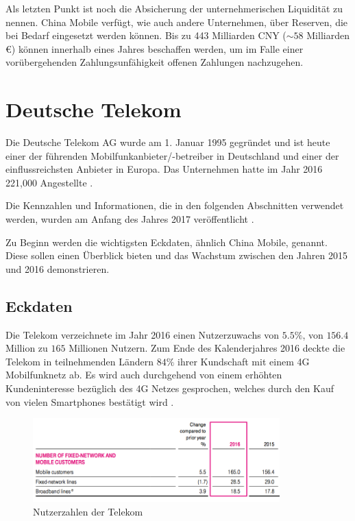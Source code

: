 Als letzten Punkt ist noch die Absicherung der unternehmerischen Liquidität zu nennen. China Mobile verfügt, wie auch andere Unternehmen, über Reserven, die bei Bedarf eingesetzt werden können. Bis zu 443 Milliarden CNY ($\sim 58$ Milliarden \euro) können innerhalb eines Jahres beschaffen werden, um im Falle einer vorübergehenden Zahlungsunfähigkeit offenen Zahlungen nachzugehen. 

\section{Deutsche Telekom}

Die Deutsche Telekom AG wurde am 1. Januar 1995 gegründet und ist heute einer der führenden Mobilfunkanbieter/-betreiber in Deutschland und einer der einflussreichsten Anbieter in Europa. Das Unternehmen hatte im Jahr 2016 221,000 Angestellte \cite{telekomsite}.

Die Kennzahlen und Informationen, die in den folgenden Abschnitten verwendet werden, wurden am Anfang des Jahres 2017 veröffentlicht \cite{telekomreport}. 

Zu Beginn werden die wichtigsten Eckdaten, ähnlich China Mobile, genannt. Diese sollen einen Überblick bieten und das Wachstum zwischen den Jahren 2015 und 2016 demonstrieren. 

\subsection{Eckdaten}

Die Telekom verzeichnete im Jahr 2016 einen Nutzerzuwachs von $5.5\%$, von $156.4$ Million zu $165$ Millionen Nutzern. Zum Ende des Kalenderjahres 2016 deckte die Telekom in teilnehmenden Ländern $84\%$ ihrer Kundschaft mit einem 4G Mobilfunknetz ab. Es wird auch durchgehend von einem erhöhten Kundeninteresse bezüglich des 4G Netzes gesprochen, welches durch den Kauf von vielen Smartphones bestätigt wird \cite{telekomreport}.


\begin{figure}[H]
\centering
\includegraphics[width=0.85\textwidth]{pictures/telekom_nutzer.png}
\caption{Nutzerzahlen der Telekom}
\label{fig:telekom}
\end{figure}

